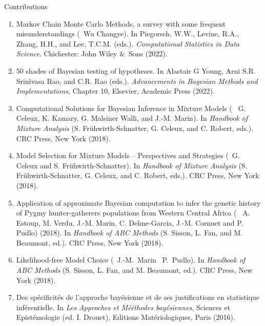 \bigskip
	\centerline{\sc Contributions \ades\ \coll}

\begin{enumerate}
\renewcommand{\theenumi}{[C-\arabic{enumi}]}

\item Markov Chain Monte Carlo Methods, a survey with some frequent misunderstandings
(\avec~Wu Changye). In Piegorsch, W.W., Levine, R.A., Zhang, H.H., and Lee, T.C.M. (eds.). {\em Computational 
Statistics in Data Science}. Chichester: John Wiley \&~Sons  (2022).

\item 50 shades of Bayesian testing of hypotheses. In Alastair G Young, Arni S.R. Srinivasa Rao, and C.R. Rao (eds.). 
{\em Advancements in Bayesian Methods and Implementations}, Chapter 10, Elsevier, Academic Press (2022).

\item Computational Solutions for Bayesian Inference in Mixture Models (\avec~ G. Celeux, K. Kamary, G. Malsiner Walli, and J.-M. Marin). In {\em Handbook of Mixture Analysis} (S. Fr\"uhwirth-Schnatter, G. Celeux, and C. Robert, eds.). CRC Press, New York (2018).

\item Model Selection for Mixture Models – Perspectives and Strategies (\avec~G. Celeux and S. Fr\"uhwirth-Schnatter). In {\em Handbook of Mixture Analysis} (S. Fr\"uhwirth-Schnatter, G. Celeux, and C. Robert, eds.). CRC Press, New York (2018).

\item Application of approximate Bayesian computation to infer the genetic history of Pygmy hunter-gatherers populations from Western Central Africa (\avec~ A. Estoup, M. Verdu, J.-M. Marin, C. Dehne-Garcia, J.-M. Cornuet and P. Pudlo) (2018). In {\em Handbook of ABC Methods} (S.
Sisson, L. Fan, and M. Beaumont, ed.). CRC Press, New York (2018).

\item Likelihood-free Model Choice (\avec\ J.-M.~Marin \et\ P.~Pudlo). In {\em Handbook of ABC Methods} (S.
Sisson, L. Fan, and M. Beaumont, ed.). CRC Press, New York (2018).

\item Des sp\'ecificit\'es de l'approche bay\'esienne et de ses justifications en statistique inf\'erentielle. In {\em
Les Approches et M\'eéthodes bay\'esiennes}, Sciences et Epist\'emologie (ed. I. Drouet), Editions Mat\'eriologiques,
Paris (2016).


\end{enumerate}
